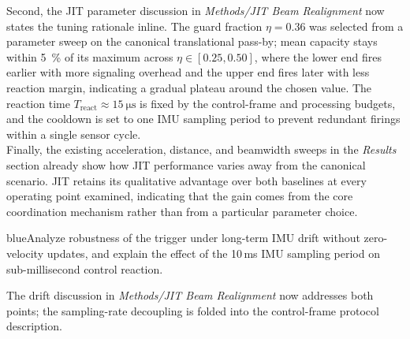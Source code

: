 \documentclass{article}
\newcommand{\blue}[1]{\begin{color}{blue}#1\end{color}}
\begin{document}
\noindent Second, the JIT parameter discussion in \emph{Methods/JIT Beam Realignment} now states the tuning rationale inline. The guard fraction $\eta = 0.36$ was selected from a parameter sweep on the canonical translational pass-by; mean capacity stays within \SI{5}{\percent} of its maximum across $\eta \in [0.25, 0.50]$, where the lower end fires earlier with more signaling overhead and the upper end fires later with less reaction margin, indicating a gradual plateau around the chosen value. The reaction time $T_{\text{react}} \approx \SI{15}{\micro\second}$ is fixed by the control-frame and processing budgets, and the cooldown is set to one IMU sampling period to prevent redundant firings within a single sensor cycle.\\

\noindent Finally, the existing acceleration, distance, and beamwidth sweeps in the \emph{Results} section already show how JIT performance varies away from the canonical scenario. JIT retains its qualitative advantage over both baselines at every operating point examined, indicating that the gain comes from the core coordination mechanism rather than from a particular parameter choice.

\begin{tcbremark}
{\selectfont
\blue{Analyze robustness of the trigger under long-term IMU drift without zero-velocity updates, and explain the effect of the 10\,ms IMU sampling period on sub-millisecond control reaction.}
}
\end{tcbremark}

\noindent The drift discussion in \emph{Methods/JIT Beam Realignment} now addresses both points; the sampling-rate decoupling is folded into the control-frame protocol description.\\
\end{document}
